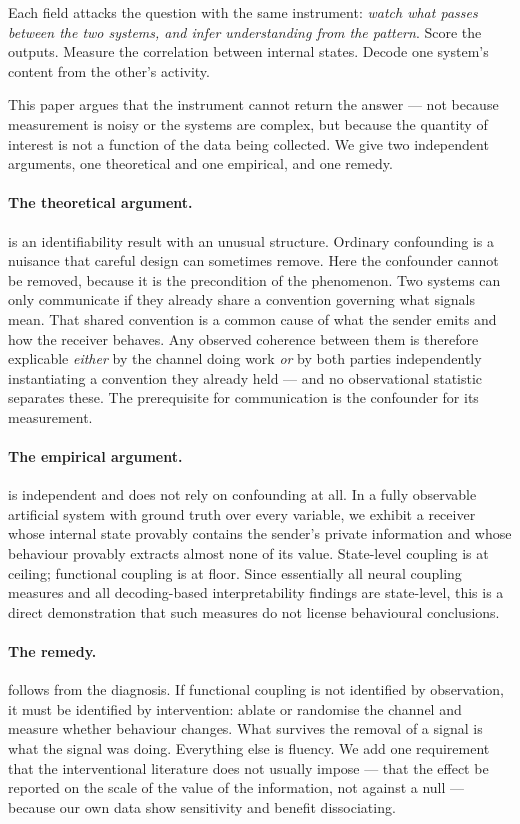 \documentclass[11pt,a4paper]{article}
\theoremstyle{plain}
\theoremstyle{definition}
\theoremstyle{remark}
\begin{document}
Each field attacks the question with the same instrument: \emph{watch what passes between
the two systems, and infer understanding from the pattern}. Score the outputs. Measure the
correlation between internal states. Decode one system's content from the other's activity.

This paper argues that the instrument cannot return the answer --- not because measurement
is noisy or the systems are complex, but because the quantity of interest is not a function
of the data being collected. We give two independent arguments, one theoretical and one
empirical, and one remedy.

\paragraph{The theoretical argument.}
 is an identifiability result with an unusual structure. Ordinary
confounding is a nuisance that careful design can sometimes remove. Here the confounder
cannot be removed, because it is the precondition of the phenomenon. Two systems can only
communicate if they already share a convention governing what signals mean. That shared
convention is a common cause of what the sender emits and how the receiver behaves. Any
observed coherence between them is therefore explicable \emph{either} by the channel doing
work \emph{or} by both parties independently instantiating a convention they already
held --- and no observational statistic separates these. The prerequisite for communication
is the confounder for its measurement.

\paragraph{The empirical argument.}
 is independent and does not rely on confounding at all. In a fully
observable artificial system with ground truth over every variable, we exhibit a receiver
whose internal state provably contains the sender's private information and whose behaviour
provably extracts almost none of its value. State-level coupling is at ceiling; functional
coupling is at floor. Since essentially all neural coupling measures and all decoding-based
interpretability findings are state-level, this is a direct demonstration that such measures
do not license behavioural conclusions.

\paragraph{The remedy.}
 follows from the diagnosis. If functional coupling is not identified by
observation, it must be identified by intervention: ablate or randomise the channel and
measure whether behaviour changes. What survives the removal of a signal is what the signal
was doing. Everything else is fluency. We add one requirement that the interventional
literature does not usually impose --- that the effect be reported on the scale of the value
of the information, not against a null --- because our own data show sensitivity and benefit
dissociating.
\end{document}
